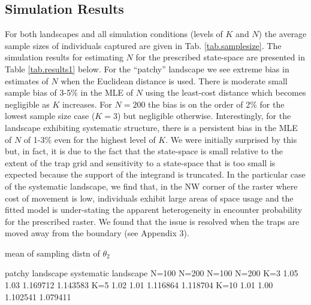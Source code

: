 \documentclass[12pt]{article}
\begin{document}
\begin{spacing}{1.8}
\subsection{Simulation Results}

For both landscapes and all simulation conditions (levels of $K$ and
$N$) the average sample sizes of individuals captured are given in
Tab. \ref{tab.samplesize}.  The simulation results for estimating $N$
for the prescribed state-space are presented in Table
\ref{tab.results1} below.  For the ``patchy'' landscape we see extreme
bias in estimates of $N$ when the Euclidean distance is used. There is
moderate small sample bias of 3-5\% in the MLE of $N$ using the
least-cost distance which becomes negligible as $K$ increases. For
$N=200$ the bias is on the order of 2\% for the lowest sample size
case ($K=3$) but negligible otherwise.  Interestingly, for the
landscape exhibiting systematic structure, there is a persistent bias
in the MLE of $N$ of 1-3\% even for the highest level of $K$. We were
initially surprised by this but, in fact, it is due to the fact that
the state-space is small relative to the extent of the trap grid and
sensitivity to a state-space that is too small is expected because the
support of the integrand is truncated. In the particular case of the
systematic landscape, we find that, in the NW corner of the raster
where cost of movement is low, individuals exhibit large areas of
space usage and the fitted model is under-stating the apparent
heterogeneity in encounter probability for the prescribed raster.  We
found that the issue is resolved when the traps are moved away from
the boundary (see Appendix 3).





























mean of sampling distn of $\theta_{2}$

     patchy landscape     systematic landscape
      N=100   N=200        N=100   N=200
K=3    1.05    1.03      1.169712 1.143583
K=5    1.02    1.01      1.116864 1.118704
K=10   1.01    1.00      1.102541 1.079411









\end{spacing}
\end{document}
